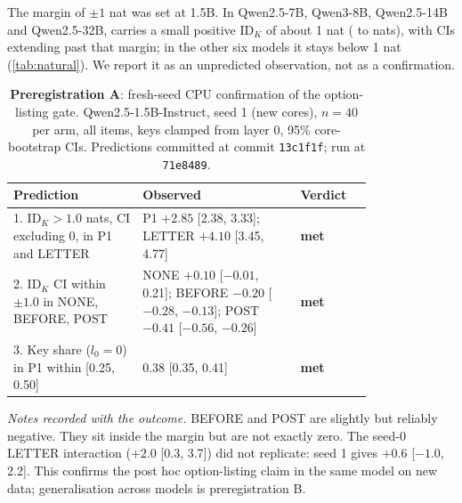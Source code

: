 The \fmtNone{} margin of $\pm 1$ nat was set at 1.5B. In Qwen2.5-7B, Qwen3-8B, Qwen2.5-14B and Qwen2.5-32B, \fmtNone{} carries a small positive $\mathrm{ID}_K$ of about 1 nat (\idKNoneQwenSeven{} to \noneMax{} nats), with CIs extending past that margin; in the other six models it stays below 1 nat (\cref{tab:natural}). We report it as an unpredicted observation, not as a confirmation.

\begin{table}[h]
\centering
\small
\caption{\textbf{Preregistration A}: fresh-seed CPU confirmation of the option-listing gate. Qwen2.5-1.5B-Instruct, seed 1 (new cores), $n = 40$ per arm, all items, keys clamped from layer 0, 95\% core-bootstrap CIs. Predictions committed at commit \texttt{13c1f1f}; run at \texttt{71e8489}.}
\label{tab:prereg-a}
\begin{tabular}{p{0.36\linewidth}p{0.44\linewidth}l}
\toprule
Prediction & Observed & Verdict \\
\midrule
1. $\mathrm{ID}_K > 1.0$ nats, CI excluding 0, in P1 and LETTER & P1 $+2.85$ [2.38, 3.33]; LETTER $+4.10$ [3.45, 4.77] & \textbf{met} \\
2. $\mathrm{ID}_K$ CI within $\pm 1.0$ in NONE, BEFORE, POST & NONE $+0.10$ [$-0.01$, 0.21]; BEFORE $-0.20$ [$-0.28$, $-0.13$]; POST $-0.41$ [$-0.56$, $-0.26$] & \textbf{met} \\
3. Key share ($l_0 = 0$) in P1 within [0.25, 0.50] & 0.38 [0.35, 0.41] & \textbf{met} \\
\bottomrule
\end{tabular}

\smallskip
\begin{minipage}{0.92\linewidth}
\footnotesize
\emph{Notes recorded with the outcome.} BEFORE and POST are slightly but reliably negative. They sit inside the margin but are not exactly zero. The seed-0 LETTER interaction ($+2.0$ [0.3, 3.7]) did not replicate: seed 1 gives $+0.6$ [$-1.0$, 2.2]. This confirms the post hoc option-listing claim in the same model on new data; generalisation across models is preregistration B.
\end{minipage}
\end{table}

